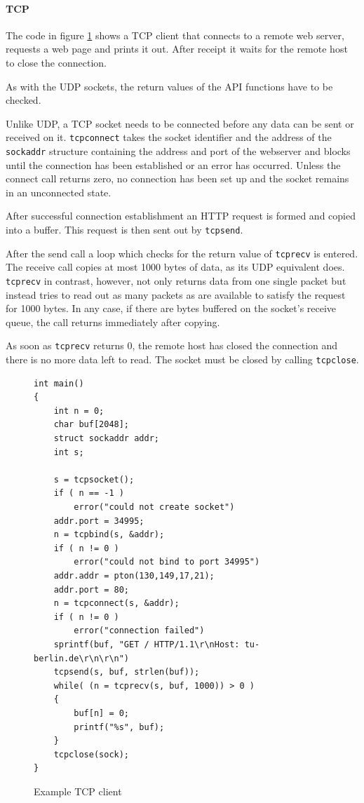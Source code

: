 \documentclass[11pt,twoside,abstract,notitlepage]{scrreprt}
\begin{document}
\paragraph{TCP}
The code in figure \ref{fig:tcpexample} shows a TCP client that connects to a remote web server, requests a web page and prints it out. After receipt it waits for the remote host to close the connection.

As with the UDP sockets, the return values of the API functions have to be checked. 

Unlike UDP, a TCP socket needs to be connected before any data can be sent or received on it. \texttt{tcpconnect} takes the socket identifier and the address of the \texttt{sockaddr} structure containing the address and port of the webserver and blocks until the connection has been established or an error has occurred.  Unless the connect call returns zero, no connection has been set up and the socket remains in an unconnected state. 

After successful connection establishment an HTTP request is formed and copied into a buffer. This request is then sent out by \texttt{tcpsend}.

After the send call a loop which checks for the return value of \texttt{tcprecv} is entered. The receive call copies at most 1000 bytes of data, as its UDP equivalent does. \texttt{tcprecv} in contrast, however, not only returns data from one single packet but instead tries to read out as many packets as are available to satisfy the request for 1000 bytes. In any case, if there are bytes buffered on the socket's receive queue, the call returns immediately after copying. 

As soon as \texttt{tcprecv} returns 0, the remote host has closed the connection and there is no more data left to read. The socket must be closed by calling \texttt{tcpclose}. 

\begin{figure}[h]
\caption{Example TCP client}
\label{fig:tcpexample}
\lstset{numbers=left, showspaces=false, showstringspaces=false, showtabs=false, tabsize=2,}
\lstset{language=[ANSI]C}
\hline
\small
\begin{lstlisting}
int main()
{
    int n = 0;
    char buf[2048];
    struct sockaddr addr;
    int s;

    s = tcpsocket();
    if ( n == -1 )
        error("could not create socket")
    addr.port = 34995;
    n = tcpbind(s, &addr);
    if ( n != 0 )
        error("could not bind to port 34995")
    addr.addr = pton(130,149,17,21);
    addr.port = 80; 
    n = tcpconnect(s, &addr);
    if ( n != 0 )
        error("connection failed")
    sprintf(buf, "GET / HTTP/1.1\r\nHost: tu-berlin.de\r\n\r\n")
    tcpsend(s, buf, strlen(buf));
    while( (n = tcprecv(s, buf, 1000)) > 0 )
    {
        buf[n] = 0; 
        printf("%s", buf);
    }
    tcpclose(sock);
}
\end{lstlisting}
\hline
\end{figure}
\end{document}
